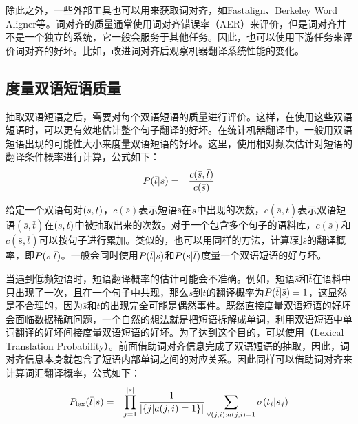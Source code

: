 \parinterval 除此之外，一些外部工具也可以用来获取词对齐，如Fastalign、Berkeley Word Aligner等。词对齐的质量通常使用词对齐错误率（AER）来评价，但是词对齐并不是一个独立的系统，它一般会服务于其他任务。因此，也可以使用下游任务来评价词对齐的好坏。比如，改进词对齐后观察机器翻译系统性能的变化。


\subsection{度量双语短语质量}

\parinterval 抽取双语短语之后，需要对每个双语短语的质量进行评价。这样，在使用这些双语短语时，可以更有效地估计整个句子翻译的好坏。在统计机器翻译中，一般用双语短语出现的可能性大小来度量双语短语的好坏。这里，使用相对频次估计对短语的翻译条件概率进行计算，公式如下：
\begin{eqnarray}
{P}(\bar{t}|\bar{s}) & = & \frac{c(\bar{s},\bar{t})}{c(\bar{s})}
\label{eq:7-13}
\end{eqnarray}

\parinterval 给定一个双语句对$({s},{t})$，$c(\bar{s})$表示短语$\bar{s}$在${s}$中出现的次数，$c(\bar{s},\bar{t})$表示双语短语$(\bar{s},\bar{t})$在$({s},{t})$中被抽取出来的次数。对于一个包含多个句子的语料库，$c(\bar{s})$和$c(\bar{s},\bar{t})$可以按句子进行累加。类似的，也可以用同样的方法，计算$\bar{t}$到$\bar{s}$的翻译概率，即${P}(\bar{s}|\bar{t})$。一般会同时使用${P}(\bar{t}|\bar{s})$和${P}(\bar{s}|\bar{t})$度量一个双语短语的好与坏。

\parinterval 当遇到低频短语时，短语翻译概率的估计可能会不准确。例如，短语$\bar{s}$和$\bar{t}$在语料中只出现了一次，且在一个句子中共现，那么$\bar{s}$到$\bar{t}$的翻译概率为${P}(\bar{t}|\bar{s})=1$，这显然是不合理的，因为$\bar{s}$和$\bar{t}$的出现完全可能是偶然事件。既然直接度量双语短语的好坏会面临数据稀疏问题，一个自然的想法就是把短语拆解成单词，利用双语短语中单词翻译的好坏间接度量双语短语的好坏。为了达到这个目的，可以使用{\small{}}（Lexical Translation Probability）。前面借助词对齐信息完成了双语短语的抽取，因此，词对齐信息本身就包含了短语内部单词之间的对应关系。因此同样可以借助词对齐来计算词汇翻译概率，公式如下：
\begin{eqnarray}
{P}_{\textrm{lex}}(\bar{t}|\bar{s}) & = & \prod_{j=1}^{|\bar{s}|} \frac{1}{|\{j|a(j,i) = 1\}|} \sum_{\forall(j,i):a(j,i) = 1} \sigma (t_i|s_j)
\label{eq:7-14}
\end{eqnarray}

